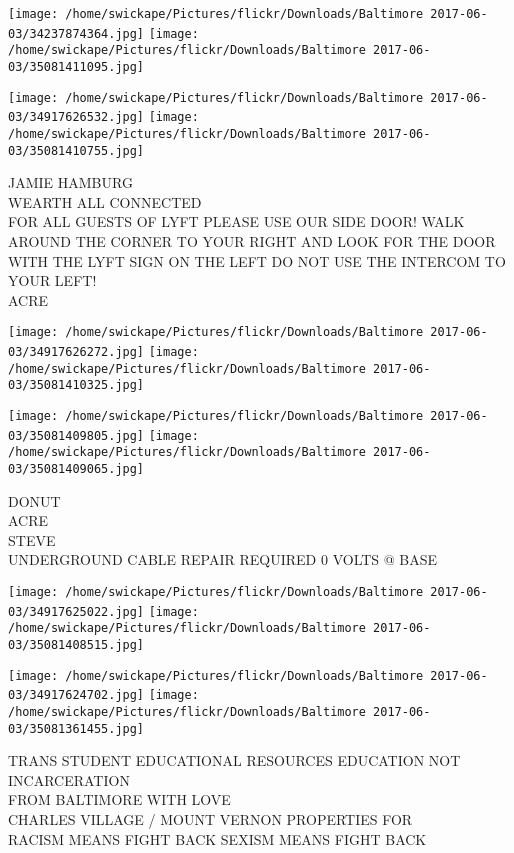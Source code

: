 \documentclass[10pt,letterpaper]{article}
\begin{document}
\texttt{[image: /home/swickape/Pictures/flickr/Downloads/Baltimore 2017-06-03/34237874364.jpg]}
\texttt{[image: /home/swickape/Pictures/flickr/Downloads/Baltimore 2017-06-03/35081411095.jpg]}

\texttt{[image: /home/swickape/Pictures/flickr/Downloads/Baltimore 2017-06-03/34917626532.jpg]}
\texttt{[image: /home/swickape/Pictures/flickr/Downloads/Baltimore 2017-06-03/35081410755.jpg]}

JAMIE HAMBURG\\
WEARTH ALL CONNECTED\\
FOR ALL GUESTS OF LYFT PLEASE USE OUR SIDE DOOR!  WALK AROUND THE CORNER TO YOUR RIGHT AND LOOK FOR THE DOOR WITH THE LYFT SIGN ON THE LEFT DO NOT USE THE INTERCOM TO YOUR LEFT!\\
ACRE\\
\pagebreak

\texttt{[image: /home/swickape/Pictures/flickr/Downloads/Baltimore 2017-06-03/34917626272.jpg]}
\texttt{[image: /home/swickape/Pictures/flickr/Downloads/Baltimore 2017-06-03/35081410325.jpg]}

\texttt{[image: /home/swickape/Pictures/flickr/Downloads/Baltimore 2017-06-03/35081409805.jpg]}
\texttt{[image: /home/swickape/Pictures/flickr/Downloads/Baltimore 2017-06-03/35081409065.jpg]}

DONUT\\
ACRE\\
STEVE\\
UNDERGROUND CABLE REPAIR REQUIRED 0 VOLTS @ BASE\\
\pagebreak

\texttt{[image: /home/swickape/Pictures/flickr/Downloads/Baltimore 2017-06-03/34917625022.jpg]}
\texttt{[image: /home/swickape/Pictures/flickr/Downloads/Baltimore 2017-06-03/35081408515.jpg]}

\texttt{[image: /home/swickape/Pictures/flickr/Downloads/Baltimore 2017-06-03/34917624702.jpg]}
\texttt{[image: /home/swickape/Pictures/flickr/Downloads/Baltimore 2017-06-03/35081361455.jpg]}

TRANS STUDENT EDUCATIONAL RESOURCES EDUCATION NOT INCARCERATION\\
FROM BALTIMORE WITH LOVE\\
CHARLES VILLAGE / MOUNT VERNON PROPERTIES FOR\\
RACISM MEANS FIGHT BACK SEXISM MEANS FIGHT BACK\\
\pagebreak
\end{document}
